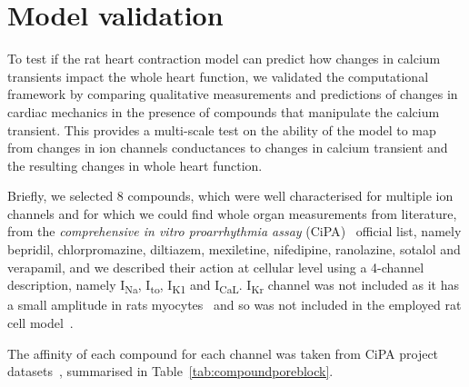 %
%
%
\section{Model validation}\label{sec:ch6modelvalidation}
To test if the rat heart contraction model can predict how changes in calcium transients impact the whole heart function, we validated the computational framework by comparing qualitative measurements and predictions of changes in cardiac mechanics in the presence of compounds that manipulate the calcium transient. This provides a multi-scale test on the ability of the model to map from changes in ion channels conductances to changes in calcium transient and the resulting changes in whole heart function.

\vspace{0.2cm}
Briefly, we selected $8$ compounds, which were well characterised for multiple ion channels and for which we could find whole organ measurements from literature, from the \textit{comprehensive in vitro proarrhythmia assay} (\acs{CiPA})~\cite{Park:2019} official list, namely bepridil, chlorpromazine, diltiazem, mexiletine, nifedipine, ranolazine, sotalol and verapamil, and we described their action at cellular level using a 4-channel description, namely I\textsubscript{Na}, I\textsubscript{to}, I\textsubscript{K1} and I\textsubscript{CaL}. I\textsubscript{Kr} channel was not included as it has a small amplitude in rats myocytes~\cite{Wymore:1997} and so was not included in the employed rat cell model~\cite{Gattoni:2017}.

\vspace{0.2cm}
The affinity of each compound for each channel was taken from CiPA project datasets~\cite{Li:2018, Li:2019}, summarised in Table~\ref{tab:compoundporeblock}.

